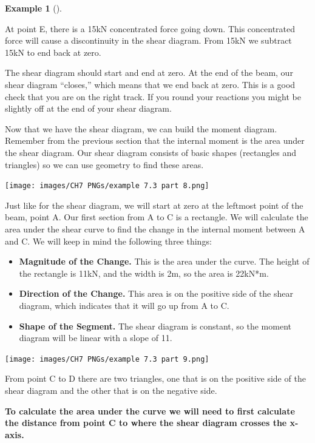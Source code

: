 \documentclass[
  letterpaper,
  DIV=11,
  numbers=noendperiod]{scrreprt}
\theoremstyle{definition}
\newtheorem{example}{Example}[chapter]
\theoremstyle{remark}
\begin{document}
\begin{tcolorbox}
\begin{example}[]
\begin{tcolorbox}
At point E, there is a 15kN concentrated force going down. This
concentrated force will cause a discontinuity in the shear diagram. From
15kN we subtract 15kN to end back at zero.

The shear diagram should start and end at zero. At the end of the beam,
our shear diagram ``closes,'' which means that we end back at zero. This
is a good check that you are on the right track. If you round your
reactions you might be slightly off at the end of your shear diagram.

Now that we have the shear diagram, we can build the moment diagram.
Remember from the previous section that the internal moment is the area
under the shear diagram. Our shear diagram consists of basic shapes
(rectangles and triangles) so we can use geometry to find these areas.

\begin{center}
\texttt{[image: images/CH7 PNGs/example 7.3 part 8.png]}
\end{center}

Just like for the shear diagram, we will start at zero at the leftmost
point of the beam, point A. Our first section from A to C is a
rectangle. We will calculate the area under the shear curve to find the
change in the internal moment between A and C. We will keep in mind the
following three things:

\begin{itemize}
\item
  \textbf{Magnitude of the Change.} This is the area under the curve.
  The height of the rectangle is 11kN, and the width is 2m, so the area
  is 22kN*m.
\item
  \textbf{Direction of the Change.} This area is on the positive side of
  the shear diagram, which indicates that it will go up from A to C.
\item
  \textbf{Shape of the Segment.} The shear diagram is constant, so the
  moment diagram will be linear with a slope of 11.
\end{itemize}

\begin{center}
\texttt{[image: images/CH7 PNGs/example 7.3 part 9.png]}
\end{center}

From point C to D there are two triangles, one that is on the positive
side of the shear diagram and the other that is on the negative side.

\textbf{To calculate the area under the curve we will need to first
calculate the distance from point C to where the shear diagram crosses
the x-axis.}


\end{tcolorbox}
\end{example}
\end{tcolorbox}
\end{document}
